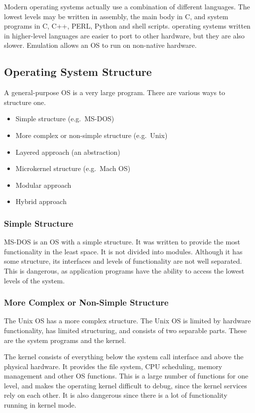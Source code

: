 Modern operating systems actually use a combination of different languages.
The lowest levels may be written in assembly, the main body in C, and system programs in C, C++, PERL, Python and shell scripts.
operating systems written in higher-level languages are easier to port to other hardware, but they are also slower.
Emulation allows an OS to run on non-native hardware.

\subsection{Operating System Structure}

A general-purpose OS is a very large program.
There are various ways to structure one.
\begin{itemize}
  \item Simple structure (e.g.\ MS-DOS)
  \item More complex or non-simple structure (e.g.\ Unix)
  \item Layered approach (an abstraction)
  \item Microkernel structure (e.g.\ Mach OS)
  \item Modular approach
  \item Hybrid approach
\end{itemize}

\subsubsection{Simple Structure}

MS-DOS is an OS with a simple structure.
It was written to provide the most functionality in the least space.
It is not divided into modules.
Although it has some structure, its interfaces and levels of functionality are not well separated.
This is dangerous, as application programs have the ability to access the lowest levels of the system.

\subsubsection{More Complex or Non-Simple Structure}

The Unix OS has a more complex structure.
The Unix OS is limited by hardware functionality, has limited structuring, and consists of two separable parts.
These are the system programs and the kernel.

The kernel consists of everything below the system call interface and above the physical hardware.
It provides the file system, CPU scheduling, memory management and other OS functions.
This is a large number of functions for one level, and makes the operating kernel difficult to debug, since the kernel services rely on each other.
It is also dangerous since there is a lot of functionality running in kernel mode.

